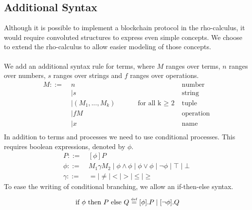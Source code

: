 \subsection{Additional Syntax} \label{sec:addsyntax}
Although it is possible to implement a blockchain protocol in the rho-calculus, it would require convoluted structures to express even simple concepts.
We choose to extend the rho-calculus to allow easier modeling of those concepts.\\
\\
We add an additional syntax rule for terms, where $M$ ranges over terms, $n$ ranges over numbers, $s$ ranges over strings and $f$ ranges over operations.
\begin{align*}
M::=\; & n &\text{number}\\
 &\mid s &\text{string}\\
 &\mid (M_1,...,M_k)\quad\quad\quad \text{for all k $\geq$ 2} &\text{tuple}\\
 &\mid fM &\text{operation}\\
 &\mid x &\text{name}\\
 \end{align*}
In addition to terms and processes we need to use conditional processes. This requires boolean expressions, denoted by \ensuremath{\phi}.
\begin{align*}
P::=& \ [\phi] P\\
\phi ::=& \ M_1\gamma M_2 \mid \phi\land\phi \mid \phi\lor\phi \mid \neg\phi \mid \top \mid \bot\\
\gamma ::=& \ = \mid \neq \mid < \mid > \mid \leq \mid \geq
\end{align*}
To ease the writing of conditional branching, we allow an if-then-else syntax.
\begin{align*}
	\text{ if }\phi\text{ then }P\text{ else }Q \overset{\underset{\mathrm{def}}{}}{=} [\phi].P \mid [\neg \phi].Q
\end{align*}


